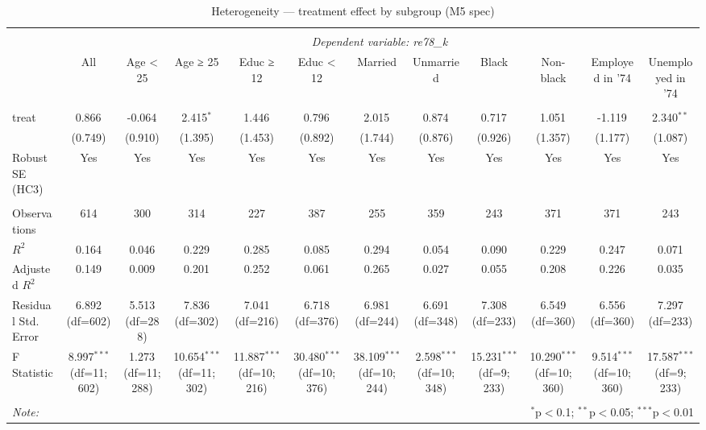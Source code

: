 \begin{table}[!htbp] \centering
  \caption{Heterogeneity — treatment effect by subgroup (M5 spec)}
\begin{tabular}{@{\extracolsep{5pt}}lccccccccccc}
\\[-1.8ex]\hline
\hline \\[-1.8ex]
& \multicolumn{11}{c}{\textit{Dependent variable: re78_k}} \
\cr \cline{2-12}
\\[-1.8ex] & \multicolumn{1}{c}{All} & \multicolumn{1}{c}{Age < 25} & \multicolumn{1}{c}{Age ≥ 25} & \multicolumn{1}{c}{Educ ≥ 12} & \multicolumn{1}{c}{Educ < 12} & \multicolumn{1}{c}{Married} & \multicolumn{1}{c}{Unmarried} & \multicolumn{1}{c}{Black} & \multicolumn{1}{c}{Non-black} & \multicolumn{1}{c}{Employed in '74} & \multicolumn{1}{c}{Unemployed in '74}  \\
\hline \\[-1.8ex]
 treat & 0.866$^{}$ & -0.064$^{}$ & 2.415$^{*}$ & 1.446$^{}$ & 0.796$^{}$ & 2.015$^{}$ & 0.874$^{}$ & 0.717$^{}$ & 1.051$^{}$ & -1.119$^{}$ & 2.340$^{**}$ \\
& (0.749) & (0.910) & (1.395) & (1.453) & (0.892) & (1.744) & (0.876) & (0.926) & (1.357) & (1.177) & (1.087) \\
 Robust SE (HC3) & Yes & Yes & Yes & Yes & Yes & Yes & Yes & Yes & Yes & Yes & Yes \\
\hline \\[-1.8ex]
 Observations & 614 & 300 & 314 & 227 & 387 & 255 & 359 & 243 & 371 & 371 & 243 \\
 $R^2$ & 0.164 & 0.046 & 0.229 & 0.285 & 0.085 & 0.294 & 0.054 & 0.090 & 0.229 & 0.247 & 0.071 \\
 Adjusted $R^2$ & 0.149 & 0.009 & 0.201 & 0.252 & 0.061 & 0.265 & 0.027 & 0.055 & 0.208 & 0.226 & 0.035 \\
 Residual Std. Error & 6.892 (df=602) & 5.513 (df=288) & 7.836 (df=302) & 7.041 (df=216) & 6.718 (df=376) & 6.981 (df=244) & 6.691 (df=348) & 7.308 (df=233) & 6.549 (df=360) & 6.556 (df=360) & 7.297 (df=233) \\
 F Statistic & 8.997$^{***}$ (df=11; 602) & 1.273$^{}$ (df=11; 288) & 10.654$^{***}$ (df=11; 302) & 11.887$^{***}$ (df=10; 216) & 30.480$^{***}$ (df=10; 376) & 38.109$^{***}$ (df=10; 244) & 2.598$^{***}$ (df=10; 348) & 15.231$^{***}$ (df=9; 233) & 10.290$^{***}$ (df=10; 360) & 9.514$^{***}$ (df=10; 360) & 17.587$^{***}$ (df=9; 233) \\
\hline
\hline \\[-1.8ex]
\textit{Note:} & \multicolumn{11}{r}{$^{*}$p$<$0.1; $^{**}$p$<$0.05; $^{***}$p$<$0.01} \\
\end{tabular}
\end{table}